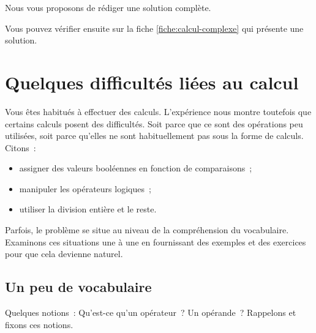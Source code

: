 			Nous vous proposons de rédiger une solution complète.
			
			Vous pouvez vérifier ensuite sur la fiche \vref{fiche:calcul-complexe}
			qui présente une solution.
				

	\section{Quelques difficultés liées au calcul}
	
		Vous êtes habitués à effectuer des calculs.  L’expérience nous montre
		toutefois que certains calculs posent des difficultés.  Soit parce
		que ce sont des opérations peu utilisées, soit parce qu'elles ne sont habituellement pas sous la forme de calculs.  Citons~:

		\begin{itemize}
		\item
			assigner des valeurs booléennes 
			en fonction de comparaisons~;
		\item
			manipuler les opérateurs logiques~;
		\item
			utiliser la division entière et le reste.
		\end{itemize}
		
		Parfois, le problème se situe au niveau de la compréhension du
		vocabulaire.  Examinons ces situations une à une en fournissant des
		exemples et des exercices pour que cela devienne naturel.

		\subsection{Un peu de vocabulaire}

			Quelques notions~: Qu’est-ce qu'un
			opérateur~? Un opérande~?  Rappelons et fixons ces notions.
			
